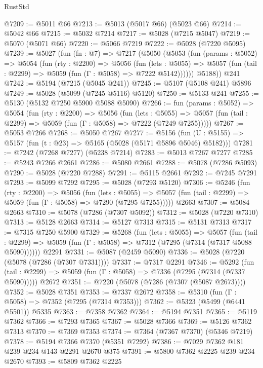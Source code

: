 \begin{lexlean}{RustStd}
\begin{coremodule}
@7209 := @5011 @66
@7213 := @5013 (@5017 @66) (@5023 @66)
@7214 := @5042 @66
@7215 := @5032 @7214
@7217 := @5028 (@7215 @5047)
@7219 := @5070 (@5071 @66)
@7220 := @5066 @7219
@7222 := @5028 (@7220 @5095)
@7239 := @5027
    (fun (fn : @7) =>
    @7217
      (@5050
        (@5053
          (fun (params : @5052) =>
          @5054
            (fun (rty : @2200) =>
            @5056
              (fun (lets : @5055) =>
              @5057 (fun (tail : @2299) => @5059 (fun (Γ : @5058) => @7222 @5142))))))
        @5188))
    @241
@7242 := @5194 (@7215 (@5045 @241))
@7245 := @5107 (@5108 @241) @5896
@7249 := @5028 (@5099 (@7245 @5116) @5120)
@7250 := @5133 @241
@7255 := @5130 (@5132 @7250 @5900 @5088 @5090)
@7266 := fun (params : @5052) =>
  @5054
    (fun (rty : @2200) =>
    @5056
      (fun (lets : @5055) =>
      @5057 (fun (tail : @2299) => @5059 (fun (Γ : @5058) => @7222 (@7249 @7255)))))
@7267 := @5053 @7266
@7268 := @5050 @7267
@7277 := @5156 (fun (U : @5155) => @5157 (fun (t : @23) => @5165 (@5028 (@5171 @5896 @5046) @5182)))
@7281 := @7242 (@7268 @7277) (@5238 @7214)
@7283 := @5013 @7267 @7277
@7285 := @5243 @7266 @2661
@7286 := @5080 @2661
@7288 := @5078 (@7286 @5093)
@7290 := @5028 (@7220 @7288)
@7291 := @5115 @2661
@7292 := @7245 @7291
@7293 := @5099 @7292
@7295 := @5028 (@7293 @5120)
@7306 := @5246
    (fun (rty : @2200) =>
    @5056
      (fun (lets : @5055) =>
      @5057 (fun (tail : @2299) => @5059 (fun (Γ : @5058) => @7290 (@7295 @7255)))))
    @2663
@7307 := @5084 @2663
@7310 := @5078 (@7286 (@7307 @5092))
@7312 := @5028 (@7220 @7310)
@7313 := @5128 @2663
@7314 := @5127 @7313
@7315 := @5131 @7313
@7317 := @7315 @7250 @5900
@7329 := @5268
    (fun (lets : @5055) =>
    @5057
      (fun (tail : @2299) => @5059 (fun (Γ : @5058) => @7312 (@7295 (@7314 (@7317 @5088 @5090))))))
    @2291
@7331 := @5087 (@2459 @5090)
@7336 := @5028 (@7220 (@5078 (@7286 (@7307 @7331))))
@7337 := @7317 @2291
@7346 := @5292
    (fun (tail : @2299) => @5059 (fun (Γ : @5058) => @7336 (@7295 (@7314 (@7337 @5090)))))
    @2672
@7351 := @7220 (@5078 (@7286 (@7307 (@5087 @2673))))
@7352 := @5028 @7351
@7353 := @7337 @2672
@7358 := @5310 (fun (Γ : @5058) => @7352 (@7295 (@7314 @7353)))
@7362 := @5323 (@5499 (@6441 @5501)) @5335
@7363 := @7358 @7362
@7364 := @5194 @7351
@7365 := @5119 @7362
@7366 := @7293 @7365
@7367 := @5028 @7366
@7369 := @5126 @7362 @7313
@7370 := @7369 @7353
@7374 := @7364 (@7367 @7370) (@5346 @7219)
@7378 := @5194 @7366 @7370 (@5351 @7292)
@7386 := @7029 @7362 @181 @239 @234 @143 @2291 @2670 @375
@7391 := @5800 @7362 @2225 @239 @234 @2670
@7393 := @5809 @7362 @2225

\end{coremodule}
\end{lexlean}
